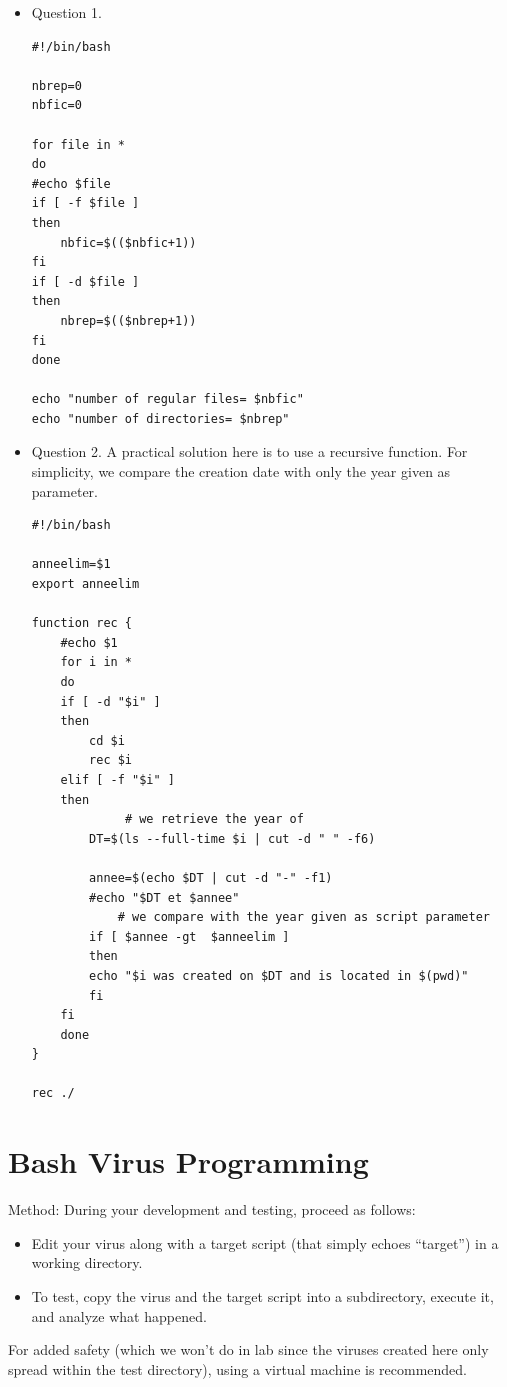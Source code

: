 \documentclass[a4paper,11pt]{article}
\theoremstyle{plain}
\theoremstyle{definition}
\begin{document}
\begin{correction}
\begin{itemize}
\item Question 1.
\begin{verbatim}
#!/bin/bash

nbrep=0
nbfic=0

for file in * 
do
#echo $file
if [ -f $file ]
then
    nbfic=$(($nbfic+1))
fi
if [ -d $file ]
then
    nbrep=$(($nbrep+1))
fi
done 

echo "number of regular files= $nbfic"
echo "number of directories= $nbrep"
\end{verbatim}

\item Question 2. A practical solution here is to use a recursive function. For simplicity, we compare the creation date with only the year given as parameter.

\begin{verbatim}
#!/bin/bash 

anneelim=$1
export anneelim

function rec {
    #echo $1 
    for i in *
    do
	if [ -d "$i" ]
	then
	    cd $i	    
	    rec $i
	elif [ -f "$i" ]
	then
             # we retrieve the year of
	    DT=$(ls --full-time $i | cut -d " " -f6) 

	    annee=$(echo $DT | cut -d "-" -f1)
	    #echo "$DT et $annee"
            # we compare with the year given as script parameter
	    if [ $annee -gt  $anneelim ]
	    then
		echo "$i was created on $DT and is located in $(pwd)"
	    fi
	fi
    done
}  

rec ./

\end{verbatim}
\end{itemize}
\end{correction}


\section{Bash Virus Programming}

{\Large Method:} During your development and testing, proceed as follows:
\begin{itemize}
\item Edit your virus along with a target script (that simply echoes ``target'') in a working directory.
\item To test, copy the virus and the target script into a subdirectory, execute it, and analyze what happened.
\end{itemize}
For added safety (which we won't do in lab since the viruses created here only spread within the test directory), using a virtual machine is recommended.
\end{document}
